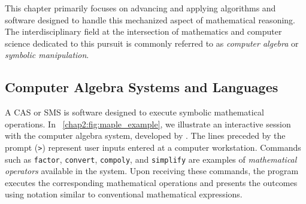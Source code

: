 This chapter primarily focuses on advancing and applying algorithms and software designed to handle this mechanized aspect of mathematical reasoning. The interdisciplinary field at the intersection of mathematics and computer science dedicated to this pursuit is commonly referred to as \emph{computer algebra} or \emph{symbolic manipulation}.

\subsection{Computer Algebra Systems and Languages}

A \ac{CAS} or \ac{SMS} is software designed to execute symbolic mathematical operations. In \figurename~\ref{chap2:fig:maple_example}, we illustrate an interactive session with the \Maple{} computer algebra system, developed by \MapleSoft{}. The lines preceded by the prompt (\texttt{>}) represent user inputs entered at a computer workstation. Commands such as \texttt{factor}, \texttt{convert}, \texttt{compoly}, and \texttt{simplify} are examples of \emph{mathematical operators} available in the \Maple{} system. Upon receiving these commands, the program executes the corresponding mathematical operations and presents the outcomes using notation similar to conventional mathematical expressions.

